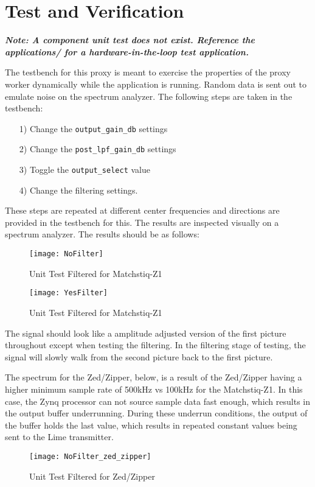 \section*{Test and Verification}
\begin{flushleft}

\textit{\textbf{Note: A component unit test does not exist.  Reference the applications/ for a hardware-in-the-loop test application.}}\\ \medskip

	The testbench for this proxy is meant to exercise the properties of the proxy worker dynamically while the application is running.  Random data is sent out to emulate noise on the spectrum analyzer. The following steps are taken in the testbench:
	\begin{itemize}
		\item[1)] Change the \verb+output_gain_db+ settings
		\item[2)] Change the \verb+post_lpf_gain_db+ settings
		\item[3)] Toggle the \verb+output_select+ value
		\item[4)] Change the filtering settings.
	\end{itemize}
	These steps are repeated at different center frequencies and directions are provided in the testbench for this.  The results are inspected visually on a spectrum analyzer.  The results should be as follows:   \\
	\begin{figure}[ht]
		\centerline{\texttt{[image: NoFilter]}}
		\caption{Unit Test Filtered for Matchstiq-Z1}
		\label{fig:nofilt}
	\end{figure}
	\newpage

	\begin{figure}[ht]
		\centerline{\texttt{[image: YesFilter]}}
		\caption{Unit Test Filtered for Matchstiq-Z1}
		\label{fig:filt}
	\end{figure}

	The signal should look like a amplitude adjusted version of the first picture throughout except when testing the filtering.  In the filtering stage of testing, the signal will slowly walk from the second picture back to the first picture.

\pagebreak
	The spectrum for the Zed/Zipper, below, is a result of the Zed/Zipper having a higher minimum sample rate of 500kHz vs 100kHz for the Matchstiq-Z1. In this case, the Zynq processor can not source sample data fast enough, which results in the output buffer underrunning. During these underrun conditions, the output of the buffer holds the last value, which results in repeated constant values being sent to the Lime transmitter.

	\begin{figure}[ht]
		\centerline{\texttt{[image: NoFilter\_zed\_zipper]}}
		\caption{Unit Test Filtered for Zed/Zipper}
		\label{fig:nofilt}
	\end{figure}
	\newpage

	\vspace{15 mm}

\end{flushleft}
